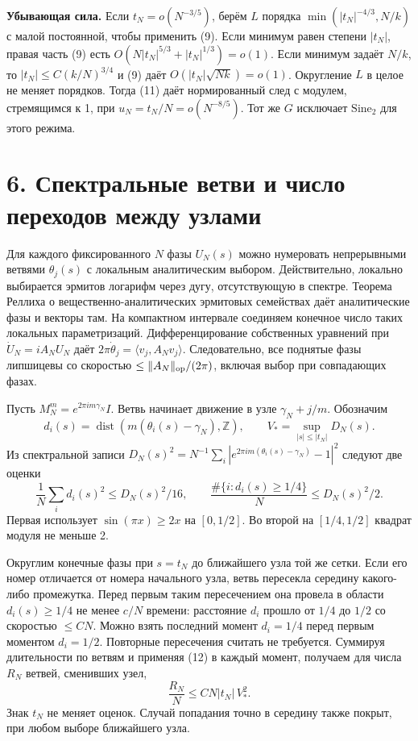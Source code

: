 \documentclass[11pt,a4paper]{article}
\newcommand{\Z}{\mathbb Z}
\newcommand{\si}{\mathrm{Sine}_2}
\newcommand{\sect}[1]{\section*{\sffamily\color{ink}#1}}
\newcommand{\subt}[1]{\par\medskip\noindent\textbf{#1.}\quad}
\begin{document}
\subt{Убывающая сила} Если $t_N=o(N^{-3/5})$, берём $L$ порядка $\min(|t_N|^{-4/3},N/k)$ с малой постоянной, чтобы применить (9). Если минимум равен степени $|t_N|$, правая часть (9) есть $O(N|t_N|^{5/3}+|t_N|^{1/3})=o(1)$. Если минимум задаёт $N/k$, то $|t_N|\le C(k/N)^{3/4}$ и (9) даёт $O(|t_N|\sqrt{Nk})=o(1)$. Округление $L$ в целое не меняет порядков. Тогда (11) даёт нормированный след с модулем, стремящимся к 1, при $u_N=t_N/N=o(N^{-8/5})$. Тот же $G$ исключает $\si$ для этого режима.
\newpage
\sect{6. Спектральные ветви и число переходов между узлами}
Для каждого фиксированного $N$ фазы $U_N(s)$ можно нумеровать непрерывными ветвями $\theta_j(s)$ с локальным аналитическим выбором. Действительно, локально выбирается эрмитов логарифм через дугу, отсутствующую в спектре. Теорема Реллиха о вещественно-аналитических эрмитовых семействах даёт аналитические фазы и векторы там. На компактном интервале соединяем конечное число таких локальных параметризаций. Дифференцирование собственных уравнений при $\dot U_N=iA_N U_N$ даёт $2\pi\dot\theta_j=\langle v_j,A_Nv_j\rangle$. Следовательно, все поднятые фазы липшицевы со скоростью $\le \|A_N\|_{\rm op}/(2\pi)$, включая выбор при совпадающих фазах.

Пусть $M_N^m=e^{2\pi i m\gamma_N}I$. Ветвь начинает движение в узле $\gamma_N+j/m$. Обозначим
\[
  d_i(s)=\operatorname{dist}\!\left(m(\theta_i(s)-\gamma_N),\Z\right),
                 \qquad V_*=\sup_{|s|\le |t_N|}D_N(s).
\]
Из спектральной записи $D_N(s)^2=N^{-1}\sum_i|e^{2\pi im(\theta_i(s)-\gamma_N)}-1|^2$ следуют две оценки
\[
       \frac1N\sum_i d_i(s)^2\le D_N(s)^2/16,\qquad
       \frac{\#\{i:d_i(s)\ge1/4\}}{N}\le D_N(s)^2/2.                \tag{12}
\]
Первая использует $\sin(\pi x)\ge2x$ на $[0,1/2]$. Во второй на $[1/4,1/2]$ квадрат модуля не меньше 2.

Округлим конечные фазы при $s=t_N$ до ближайшего узла той же сетки. Если его номер отличается от номера начального узла, ветвь пересекла середину какого-либо промежутка. Перед первым таким пересечением она провела в области $d_i(s)\ge1/4$ не менее $c/N$ времени: расстояние $d_i$ прошло от $1/4$ до $1/2$ со скоростью $\le C N$. Можно взять последний момент $d_i=1/4$ перед первым моментом $d_i=1/2$. Повторные пересечения считать не требуется. Суммируя длительности по ветвям и применяя (12) в каждый момент, получаем для числа $R_N$ ветвей, сменивших узел,
\[
                           \frac{R_N}{N}
                \le C N|t_N|\, V_*^2 .                            \tag{13}
\]
Знак $t_N$ не меняет оценок. Случай попадания точно в середину также покрыт, при любом выборе ближайшего узла.
\end{document}
